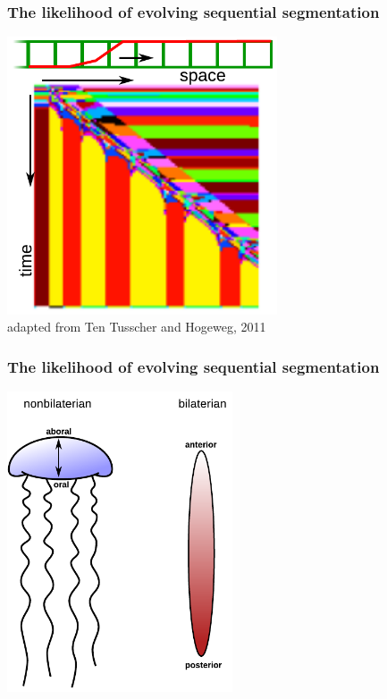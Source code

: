 \documentclass[compress]{beamer}
\begin{document}
\begin{frame}
    \frametitle{The likelihood of evolving sequential segmentation}
    \begin{center}
     \includegraphics[width=0.6\textwidth]{figures/kirsten_model.pdf}\\
    {\small adapted from Ten Tusscher and Hogeweg, 2011}
    \end{center}
 \end{frame} 

\begin{frame}
    \frametitle{The likelihood of evolving sequential segmentation}
    \begin{center}
     \includegraphics[width=0.5\textwidth]{figures/body_axis_change.pdf}\\
    \end{center}
 \end{frame} 
 
\end{document}
